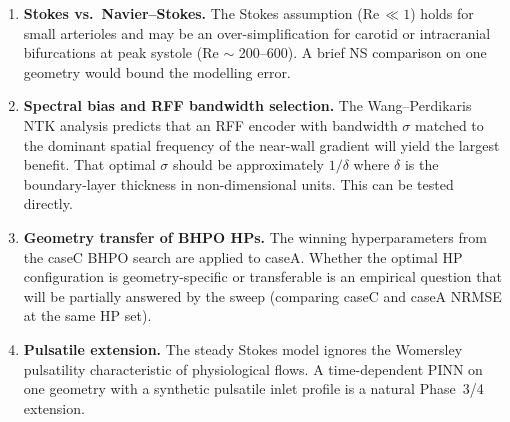 \documentclass[11pt]{article}
\begin{document}
\begin{enumerate}
\item \textbf{Stokes vs.\ Navier--Stokes.}  The Stokes assumption (Re\,$\ll 1$) holds for
small arterioles and may be an over-simplification for carotid or intracranial
bifurcations at peak systole (Re $\sim$ 200--600).  A brief NS comparison on one
geometry would bound the modelling error.

\item \textbf{Spectral bias and RFF bandwidth selection.}  The Wang--Perdikaris NTK analysis
predicts that an RFF encoder with bandwidth $\sigma$ matched to the dominant spatial
frequency of the near-wall gradient will yield the largest benefit.  That optimal
$\sigma$ should be approximately $1/\delta$ where $\delta$ is the boundary-layer
thickness in non-dimensional units.  This can be tested directly.

\item \textbf{Geometry transfer of BHPO HPs.}  The winning hyperparameters from the caseC
BHPO search are applied to caseA.  Whether the optimal HP configuration is
geometry-specific or transferable is an empirical question that will be partially
answered by the sweep (comparing caseC and caseA NRMSE at the same HP set).

\item \textbf{Pulsatile extension.}  The steady Stokes model ignores the Womersley
pulsatility characteristic of physiological flows.  A time-dependent PINN on one
geometry with a synthetic pulsatile inlet profile is a natural Phase~3/4 extension.
\end{enumerate}
\end{document}
